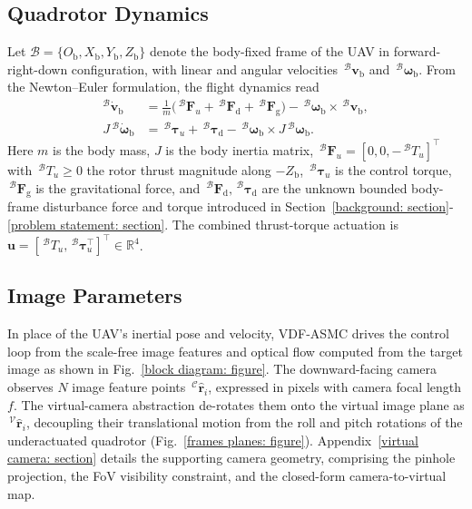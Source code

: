 \documentclass{IEEEtaes}
\begin{document}
\subsection{Quadrotor Dynamics} \label{quadrotor dynamics: section}
Let $\mathcal{B}=\{O_{\text{b}},X_{\text{b}},Y_{\text{b}},Z_{\text{b}}\}$ denote the body-fixed frame of the UAV in forward-right-down configuration, with linear and angular velocities $\,^\mathcal{B}\boldsymbol{v}_\text{b}$ and $\,^\mathcal{B}\boldsymbol{\omega}_\text{b}$. From the Newton--Euler formulation, the flight dynamics read
\begin{equation}
\label{quadrotor dynamics: equation}
    \begin{aligned}
    ^\mathcal{B}\dot{\boldsymbol{v}}_\text{b} &= \tfrac{1}{m}\big(\,^\mathcal{B}\boldsymbol{F}_u + \,^\mathcal{B}\boldsymbol{F}_\text{d} + \,^\mathcal{B}\boldsymbol{F}_\text{g}\big) - \,^\mathcal{B}\boldsymbol{\omega}_\text{b}\times\,^\mathcal{B}\boldsymbol{v}_\text{b},\\
    J\,^\mathcal{B}\dot{\boldsymbol{\omega}}_\text{b} &= \,^\mathcal{B}\boldsymbol{\tau}_u + \,^\mathcal{B}\boldsymbol{\tau}_\text{d} - \,^\mathcal{B}\boldsymbol{\omega}_\text{b}\times J\,^\mathcal{B}\boldsymbol{\omega}_\text{b}.
    \end{aligned}
 \end{equation}
Here $m$ is the body mass, $J$ is the body inertia matrix, $\,^\mathcal{B} \boldsymbol{F}_u = [0,0,-\,^\mathcal{B} T_u]^\top$ with $\,^\mathcal{B} T_u\ge 0$ the rotor thrust magnitude along $-Z_\text{b}$, $\,^\mathcal{B} \boldsymbol{\tau}_u$ is the control torque, $\,^\mathcal{B} \boldsymbol{F}_\text{g}$ is the gravitational force, and $\,^\mathcal{B} \boldsymbol{F}_\text{d},\,^\mathcal{B} \boldsymbol{\tau}_\text{d}$ are the unknown bounded body-frame disturbance force and torque introduced in Section~\ref{background: section}-\ref{problem statement: section}. The combined thrust-torque actuation is $\boldsymbol{u}=[\,^\mathcal{B}T_u,\,^\mathcal{B}\boldsymbol{\tau}_u^\top]^\top\in\mathbb{R}^4$.

\subsection{Image Parameters} \label{image parameters: section}
In place of the UAV's inertial pose and velocity, VDF-ASMC drives the control loop from the scale-free image features and optical flow computed from the target image as shown in Fig.~\ref{block diagram: figure}. The downward-facing camera observes $N$ image feature points $\,^\mathcal{C}\hat{\boldsymbol{r}}_i$, expressed in pixels with camera focal length $f$. The virtual-camera abstraction de-rotates them onto the virtual image plane as $\,^\mathcal{V}\hat{\boldsymbol{r}}_i$, decoupling their translational motion from the roll and pitch rotations of the underactuated quadrotor (Fig.~\ref{frames planes: figure}). Appendix~\ref{virtual camera: section} details the supporting camera geometry, comprising the pinhole projection, the FoV visibility constraint, and the closed-form camera-to-virtual map.
\end{document}
